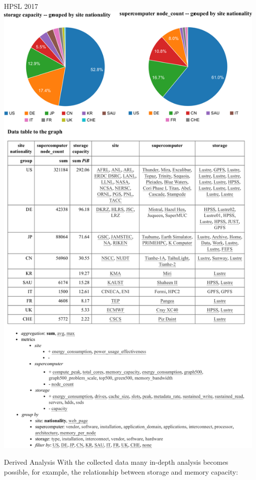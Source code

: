 \documentclass[portrait,a0paper,fontscale=0.4]{baposter}
\begin{document}
\begin{poster}
\begin{posterbox}[name=engineering,column=3]{HPSL 2017}
\includegraphics[width=\textwidth]{hpsl-figure}
\end{posterbox}




\begin{posterbox}[name=awareness,column=3,below=engineering]{Derived Analysis}
With the collected data many in-depth analysis becomes possible, for example, 
the relationship between storage and memory capacity:

\vspace*{-1em}


\end{posterbox}
\end{poster}
\end{document}
